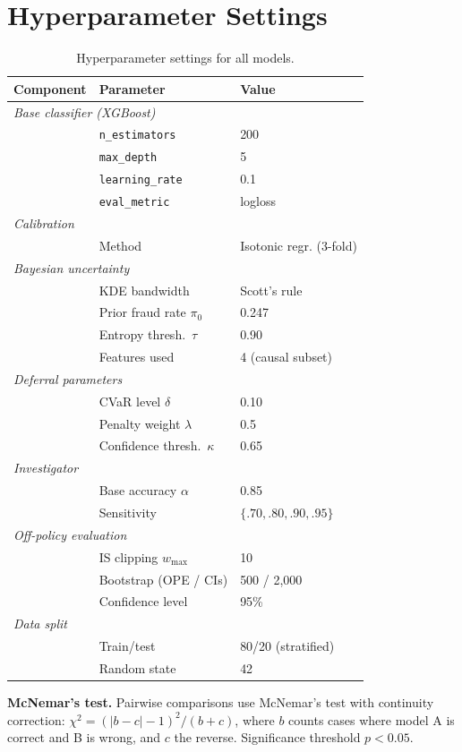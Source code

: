 \clearpage
\raggedbottom
\section{Hyperparameter Settings}
\label{app:hyperparams}

\vspace{-0.5em}
\begin{table}[H]
\caption{Hyperparameter settings for all models.}
\label{tab:hyperparams}
\begin{center}
\begin{small}
\begin{tabular}{lll}
\toprule
Component & Parameter & Value \\
\midrule
\multicolumn{3}{l}{\textit{Base classifier (XGBoost)}} \\
& \texttt{n\_estimators} & 200 \\
& \texttt{max\_depth} & 5 \\
& \texttt{learning\_rate} & 0.1 \\
& \texttt{eval\_metric} & logloss \\
\midrule
\multicolumn{3}{l}{\textit{Calibration}} \\
& Method & Isotonic regr. (3-fold) \\
\midrule
\multicolumn{3}{l}{\textit{Bayesian uncertainty}} \\
& KDE bandwidth & Scott's rule \\
& Prior fraud rate $\pi_0$ & 0.247 \\
& Entropy thresh.\ $\tau$ & 0.90 \\
& Features used & 4 (causal subset) \\
\midrule
\multicolumn{3}{l}{\textit{Deferral parameters}} \\
& CVaR level $\delta$ & 0.10 \\
& Penalty weight $\lambda$ & 0.5 \\
& Confidence thresh.\ $\kappa$ & 0.65 \\
\midrule
\multicolumn{3}{l}{\textit{Investigator}} \\
& Base accuracy $\alpha$ & 0.85 \\
& Sensitivity & $\{.70,.80,.90,.95\}$ \\
\midrule
\multicolumn{3}{l}{\textit{Off-policy evaluation}} \\
& IS clipping $w_{\max}$ & 10 \\
& Bootstrap (OPE / CIs) & 500 / 2{,}000 \\
& Confidence level & 95\% \\
\midrule
\multicolumn{3}{l}{\textit{Data split}} \\
& Train/test & 80/20 (stratified) \\
& Random state & 42 \\
\bottomrule
\end{tabular}
\end{small}
\end{center}
\vspace{0.5em}
\small
\textbf{McNemar's test.} Pairwise comparisons use McNemar's test with continuity correction: $\chi^2 = (|b-c|-1)^2 / (b+c)$, where $b$ counts cases where model A is correct and B is wrong, and $c$ the reverse. Significance threshold $p < 0.05$.


\end{table}
